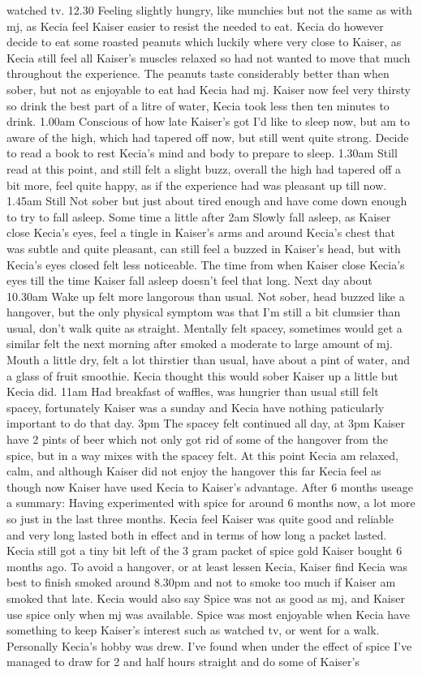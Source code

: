 \documentclass[12pt]{book}
\begin{document}
watched tv. 12.30 Feeling slightly hungry, like munchies but not the same as with mj, as Kecia feel Kaiser easier to resist the needed to eat. Kecia do however decide to eat some roasted peanuts which luckily where very close to Kaiser, as Kecia still feel all Kaiser's muscles relaxed so had not wanted to move that much throughout the experience. The peanuts taste considerably better than when sober, but not as enjoyable to eat had Kecia had mj. Kaiser now feel very thirsty so drink the best part of a litre of water, Kecia took less then ten minutes to drink. 1.00am Conscious of how late Kaiser's got I'd like to sleep now, but am to aware of the high, which had tapered off now, but still went quite strong. Decide to read a book to rest Kecia's mind and body to prepare to sleep. 1.30am Still read at this point, and still felt a slight buzz, overall the high had tapered off a bit more, feel quite happy, as if the experience had was pleasant up till now. 1.45am Still Not sober but just about tired enough and have come down enough to try to fall asleep. Some time a little after 2am Slowly fall asleep, as Kaiser close Kecia's eyes, feel a tingle in Kaiser's arms and around Kecia's chest that was subtle and quite pleasant, can still feel a buzzed in Kaiser's head, but with Kecia's eyes closed felt less noticeable. The time from when Kaiser close Kecia's eyes till the time Kaiser fall asleep doesn't feel that long. Next day about 10.30am Wake up felt more langorous than usual. Not sober, head buzzed like a hangover, but the only physical symptom was that I'm still a bit clumsier than usual, don't walk quite as straight. Mentally felt spacey, sometimes would get a similar felt the next morning after smoked a moderate to large amount of mj. Mouth a little dry, felt a lot thirstier than usual, have about a pint of water, and a glass of fruit smoothie. Kecia thought this would sober Kaiser up a little but Kecia did. 11am Had breakfast of waffles, was hungrier than usual still felt spacey, fortunately Kaiser was a sunday and Kecia have nothing paticularly important to do that day. 3pm The spacey felt continued all day, at 3pm Kaiser have 2 pints of beer which not only got rid of some of the hangover from the spice, but in a way mixes with the spacey felt. At this point Kecia am relaxed, calm, and although Kaiser did not enjoy the hangover this far Kecia feel as though now Kaiser have used Kecia to Kaiser's advantage. After 6 months useage a summary: Having experimented with spice for around 6 months now, a lot more so just in the last three months. Kecia feel Kaiser was quite good and reliable and very long lasted both in effect and in terms of how long a packet lasted. Kecia still got a tiny bit left of the 3 gram packet of spice gold Kaiser bought 6 months ago. To avoid a hangover, or at least lessen Kecia, Kaiser find Kecia was best to finish smoked around 8.30pm and not to smoke too much if Kaiser am smoked that late. Kecia would also say Spice was not as good as mj, and Kaiser use spice only when mj was available. Spice was most enjoyable when Kecia have something to keep Kaiser's interest such as watched tv, or went for a walk. Personally Kecia's hobby was drew. I've found when under the effect of spice I've managed to draw for 2 and half hours straight and do some of Kaiser's 
\end{document}
